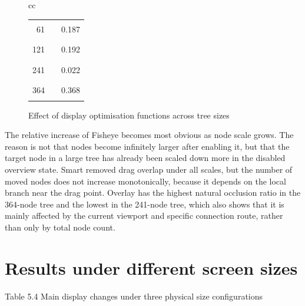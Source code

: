 \begin{center}
\begin{figure}[htbp]
\begin{tabular}{cc}
\begin{minipage}[t]{0.46\textwidth}
\begin{tabular}{@{}r l r@{}}
61 & \textcolor{blue!70!black}{\rule{0.1017\textwidth}{1.1ex}} & 0.187 \\
121 & \textcolor{blue!70!black}{\rule{0.1043\textwidth}{1.1ex}} & 0.192 \\
241 & \textcolor{blue!70!black}{\rule{0.0180\textwidth}{1.1ex}} & 0.022 \\
364 & \textcolor{blue!70!black}{\rule{0.2000\textwidth}{1.1ex}} & 0.368 \\
\end{tabular}
\end{minipage}
\end{tabular}
\caption{Effect of display optimisation functions across tree sizes}
\label{fig:display-size-metrics}
\end{figure}

\end{center}

The relative increase of Fisheye becomes most obvious as node scale grows. The reason is not that nodes become infinitely larger after enabling it, but that the target node in a large tree has already been scaled down more in the disabled overview state. Smart removed drag overlap under all scales, but the number of moved nodes does not increase monotonically, because it depends on the local branch near the drag point. Overlay has the highest natural occlusion ratio in the 364-node tree and the lowest in the 241-node tree, which also shows that it is mainly affected by the current viewport and specific connection route, rather than only by total node count.

\section{Results under different screen sizes}

Table 5.4 Main display changes under three physical size configurations

